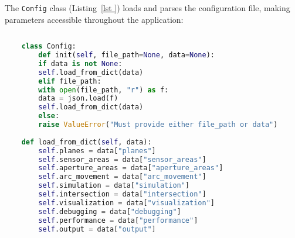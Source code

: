 The \texttt{Config} class (Listing~\ref{lst
}) loads and parses the configuration file, making parameters accessible throughout the application:
\begin{lstlisting}[style=pythonstyle, caption=Python Serial Receive Script, label=lst:pythonCodeApp, language=Python ]
    
    class Config:
        def init(self, file_path=None, data=None):
        if data is not None:
        self.load_from_dict(data)
        elif file_path:
        with open(file_path, "r") as f:
        data = json.load(f)
        self.load_from_dict(data)
        else:
        raise ValueError("Must provide either file_path or data")
    
    def load_from_dict(self, data):
        self.planes = data["planes"]
        self.sensor_areas = data["sensor_areas"]
        self.aperture_areas = data["aperture_areas"]
        self.arc_movement = data["arc_movement"]
        self.simulation = data["simulation"]
        self.intersection = data["intersection"]
        self.visualization = data["visualization"]
        self.debugging = data["debugging"]
        self.performance = data["performance"]
        self.output = data["output"]
    \end{lstlisting}